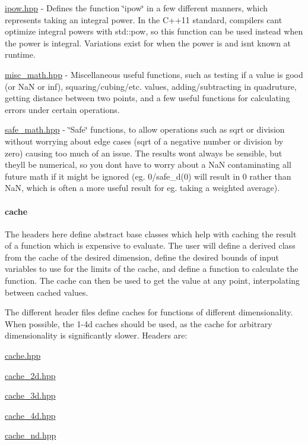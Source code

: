 \begin{DoxyItemize}
\item \hyperlink{ipow_8hpp}{ipow.\+hpp} -\/ Defines the function \char`\"{}ipow\char`\"{} in a few different manners, which represents taking an integral power. In the C++11 standard, compilers can\textquotesingle{}t optimize integral powers with std\+::pow, so this function can be used instead when the power is integral. Variations exist for when the power is and isn\textquotesingle{}t known at runtime.
\item \hyperlink{misc__math_8hpp}{misc\+\_\+math.\+hpp} -\/ Miscellaneous useful functions, such as testing if a value is good (or Na\+N or inf), squaring/cubing/etc. values, adding/subtracting in quadruture, getting distance between two points, and a few useful functions for calculating errors under certain operations.
\item \hyperlink{safe__math_8hpp}{safe\+\_\+math.\+hpp} -\/ \char`\"{}\+Safe\char`\"{} functions, to allow operations such as sqrt or division without worrying about edge cases (sqrt of a negative number or division by zero) causing too much of an issue. The results won\textquotesingle{}t always be sensible, but they\textquotesingle{}ll be numerical, so you don\textquotesingle{}t have to worry about a Na\+N contaminating all future math if it might be ignored (eg. 0/safe\+\_\+d(0) will result in 0 rather than Na\+N, which is often a more useful result for eg. taking a weighted average).
\end{DoxyItemize}

\paragraph*{cache}

The headers here define abstract base classes which help with caching the result of a function which is expensive to evaluate. The user will define a derived class from the cache of the desired dimension, define the desired bounds of input variables to use for the limits of the cache, and define a function to calculate the function. The cache can then be used to get the value at any point, interpolating between cached values.

The different header files define caches for functions of different dimensionality. When possible, the 1-\/4d caches should be used, as the cache for arbitrary dimensionality is significantly slower. Headers are\+:


\begin{DoxyItemize}
\item \hyperlink{cache_8hpp}{cache.\+hpp}
\item \hyperlink{cache__2d_8hpp}{cache\+\_\+2d.\+hpp}
\item \hyperlink{cache__3d_8hpp}{cache\+\_\+3d.\+hpp}
\item \hyperlink{cache__4d_8hpp}{cache\+\_\+4d.\+hpp}
\item \hyperlink{cache__nd_8hpp}{cache\+\_\+nd.\+hpp}
\end{DoxyItemize}

